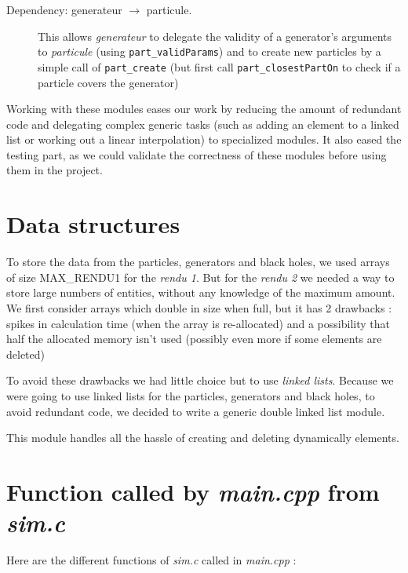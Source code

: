 \documentclass[a4paper]{article} %
\begin{document}
\begin{multicols*}{2}
\begin{description}
\item[Dependency: generateur $\rightarrow$ particule.]
This allows \emph{generateur} to delegate the validity of a generator's arguments to \emph{particule}
(using \texttt{part\_validParams}) 
and to create new particles by a simple call of \texttt{part\_create}
(but first call \texttt{part\_closestPartOn} to check if a particle covers the generator)
\end{description}

Working with these modules eases our work by reducing the amount of redundant code and delegating complex generic tasks
(such as adding an element to a linked list or working out a linear interpolation) to specialized modules.
It also eased the testing part, as we could validate the correctness of these modules before using them in the project.

\section{Data structures}

To store the data from the particles, generators and black holes,
we used arrays of size MAX\_RENDU1 for the \emph{rendu 1}.
But for the \emph{rendu 2} we needed a way to store large numbers of entities,
without any knowledge of the maximum amount.
We first consider arrays which double in size when full, but it has 2 drawbacks :
spikes in calculation time (when the array is re-allocated)
and a possibility that half the allocated memory isn't used (possibly even more if some elements are deleted)

To avoid these drawbacks we had little choice but to use \emph{linked lists}.
Because we were going to use linked lists for the particles, generators and black holes, to avoid redundant code,
we decided to write a generic double linked list module.

This module handles all the hassle of creating and deleting dynamically elements.



\section{Function called by \emph{main.cpp} from \emph{sim.c}}
Here are the different functions of \emph{sim.c} called in \emph{main.cpp} :


\end{multicols*}
\end{document}
